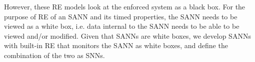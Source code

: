 However, these \ac{RE} models look at the enforced system as a black box. 
For the purpose of \ac{RE} of an \ac{SANN} and its timed properties, the \ac{SANN} needs to be viewed as a white box, i.e. data internal to the \ac{SANN} needs to be able to be viewed and/or modified.
Given that \acp{SANN} are white boxes, we develop \acp{SANN} with built-in \ac{RE} that monitors the \ac{SANN} as white boxes, and define the combination of the two as \acfp{SNN}.








